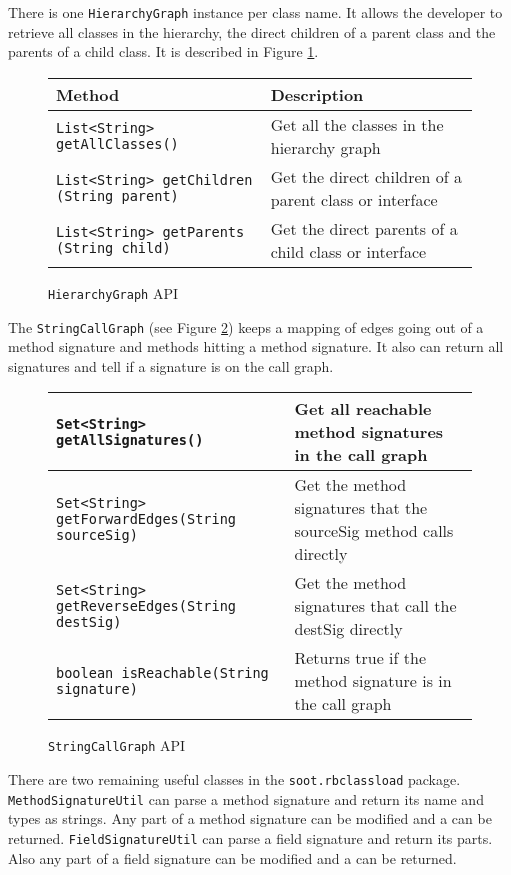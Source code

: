 \documentclass[preprint]{sigplanconf}
\begin{document}
There is one {\tt HierarchyGraph} instance per class name. It allows the developer to retrieve all classes in the hierarchy, the direct children of a parent class and the parents of a child class. It is described in Figure \ref{fig:hg}.

\begin{figure}[htbf]
\begin{tabularx}{\columnwidth}{|XX|}
\hline
{\bf Method} & {\bf Description }\\\hline
{\tt List<String> getAllClasses()} &  Get all the classes in the 
    hierarchy graph\\\hline
{\tt List<String> getChildren (String parent)} &  Get the direct 
    children of a parent class or interface\\\hline
{\tt List<String> getParents (String child)} &  Get the direct
    parents of a child class or interface\\\hline
\end{tabularx}
\caption{{\tt HierarchyGraph} API}
\label{fig:hg}
\end{figure}

The {\tt StringCallGraph} (see Figure \ref{fig:scg}) keeps a mapping of edges going out of a method signature and methods hitting a method signature. It also can return all signatures and tell if a signature is on the call graph.

\begin{figure}[htbf]
\begin{tabularx}{\columnwidth}{|XX|}
\hline
{\tt Set<String> getAllSignatures()} & Get all reachable method 
    signatures in the call graph\\\hline 
{\tt Set<String> getForwardEdges(String sourceSig)} & Get the
    method signatures that the sourceSig method calls directly\\\hline  
{\tt Set<String> getReverseEdges(String destSig)} & Get the
    method signatures that call the destSig directly\\\hline
{\tt boolean isReachable(String signature)} & Returns true if the
    method signature is in the call graph\\\hline
\end{tabularx}
\caption{{\tt StringCallGraph} API}
\label{fig:scg}
\end{figure}

There are two remaining useful classes in the {\tt soot.\-rbclassload} package. {\tt MethodSignatureUtil} can parse a method signature and return its name and types as strings. Any part of a method signature can be modified and a \sootmethod can be returned. {\tt FieldSignatureUtil} can parse a field signature and return its parts. Also any part of a field signature can be modified and a \sootfield can be returned.
\end{document}
